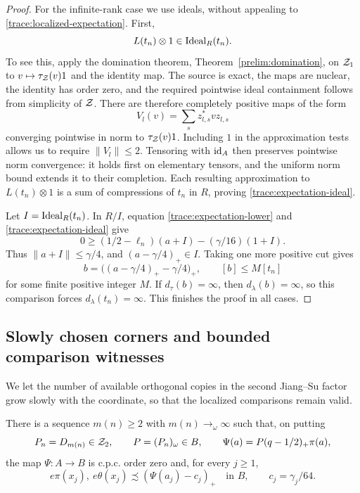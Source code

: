 \begin{proof}
For the infinite-rank case we use ideals, without appealing to
\eqref{trace:localized-expectation}.  First,
\begin{equation}\label{trace:expectation-ideal}
 L(t_n)\otimes1\in\operatorname{Ideal}_R(t_n).
\end{equation}
To see this, apply the domination theorem,
Theorem~\ref{prelim:domination}, on $\mathcal Z_1$ to
$v\mapsto\tau_{\mathcal Z}(v)1$ and the identity map.  The source is exact,
the maps are nuclear, the identity has order zero, and the required
pointwise ideal containment follows from simplicity of $\mathcal Z$.
There are therefore completely positive maps of the form
\[
 V_l(v)=\sum_s z_{l,s}^*vz_{l,s}
\]
converging pointwise in norm to $\tau_{\mathcal Z}(v)1$.  Including $1$ in
the approximation tests allows us to require $\|V_l\|\leq2$.
Tensoring with $\mathrm{id}_A$ then preserves pointwise norm convergence:
it holds first on elementary tensors, and the uniform norm bound
extends it to their completion.  Each resulting approximation to
$L(t_n)\otimes1$ is a sum of compressions of $t_n$ in $R$, proving
\eqref{trace:expectation-ideal}.

Let $I=\operatorname{Ideal}_R(t_n)$.  In $R/I$, equation
\eqref{trace:expectation-lower} and
\eqref{trace:expectation-ideal} give
\[
 0\geq(1/2-\ell_n)(a+I)-(\gamma/16)(1+I).
\]
Thus $\|a+I\|\leq\gamma/4$, and $(a-\gamma/4)_+\in I$.
Taking one more positive cut gives
\[
 b=\bigl((a-\gamma/4)_+-\gamma/4\bigr)_+,
 \qquad [b]\leq M[t_n]
\]
for some finite positive integer $M$.  If $d_\tau(b)=\infty$, then
$d_\lambda(b)=\infty$, so this comparison forces
$d_\lambda(t_n)=\infty$.  This finishes the proof in all cases.
\end{proof}

\subsection{Slowly chosen corners and bounded comparison witnesses}

We let the number of available orthogonal copies in the second
Jiang--Su factor grow slowly with the coordinate, so that the
localized comparisons remain valid.

\begin{proposition}\label{trace:comparison}
There is a sequence $m(n)\geq2$ with $m(n)\to_\omega\infty$ such
that, on putting
\[
 P_n=D_{m(n)}\in\mathcal Z_2,\qquad P=(P_n)_\omega\in B,
 \qquad
 \Psi(a)=P(q-1/2)_+\pi(a),
\]
the map $\Psi\colon A\to B$ is c.p.c. order zero and, for every
$j\geq1$,
\begin{equation}\label{trace:small-part-comparison}
 e\pi(x_j),\ e\theta(x_j)
 \precsim (\Psi(a_j)-c_j)_+
 \quad\text{in }B,
 \qquad c_j=\gamma_j/64.
\end{equation}
\end{proposition}

